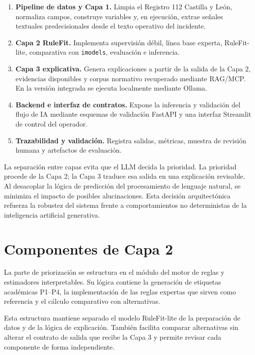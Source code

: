 \begin{enumerate}
    \item \textbf{Pipeline de datos y Capa 1.} Limpia el Registro 112 Castilla y León, normaliza campos, construye variables y, en ejecución, extrae señales textuales predecisionales desde el texto operativo del incidente.
    \item \textbf{Capa 2 RuleFit.} Implementa supervisión débil, línea base experta, RuleFit-lite, comparativa con \texttt{imodels}, evaluación e inferencia.
    \item \textbf{Capa 3 explicativa.} Genera explicaciones a partir de la salida de la Capa 2, evidencias disponibles y corpus normativo recuperado mediante RAG/MCP. En la versión integrada se ejecuta localmente mediante Ollama.
    \item \textbf{Backend e interfaz de contratos.} Expone la inferencia y validación del flujo de IA mediante esquemas de validación FastAPI \cite{FastAPI2026} y una interfaz Streamlit \cite{Streamlit2026} de control del operador.
    \item \textbf{Trazabilidad y validación.} Registra salidas, métricas, muestra de revisión humana y artefactos de evaluación.
\end{enumerate}

La separación entre capas evita que el LLM decida la prioridad. La prioridad procede de la Capa 2; la Capa 3 traduce esa salida en una explicación revisable. Al desacoplar la lógica de predicción del procesamiento de lenguaje natural, se minimiza el impacto de posibles alucinaciones. Esta decisión arquitectónica refuerza la robustez del sistema frente a comportamientos no deterministas de la inteligencia artificial generativa.

\section{Componentes de Capa 2}

La parte de priorización se estructura en el módulo del motor de reglas y estimadores interpretables. Su lógica contiene la generación de etiquetas académicas P1--P4, la implementación de las reglas expertas que sirven como referencia y el cálculo comparativo con alternativas.

Esta estructura mantiene separado el modelo RuleFit-lite de la preparación de datos y de la lógica de explicación. También facilita comparar alternativas sin alterar el contrato de salida que recibe la Capa 3 y permite revisar cada componente de forma independiente.

